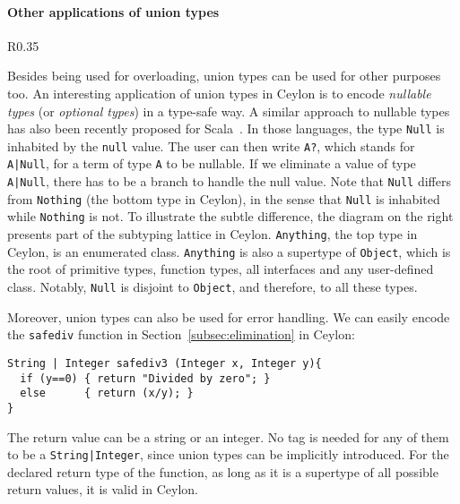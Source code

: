 \paragraph{Other applications of union types}
\begin{wrapfigure}{R}{0.35\textwidth}
\begin{center}
\end{center}
\end{wrapfigure}
Besides being used for overloading, union types can be used for other purposes too.
An interesting application of union types in Ceylon is to
encode \textit{nullable types} (or \textit{optional types}) in a type-safe way.
A similar approach to nullable types has also been recently proposed for
Scala~\citep{nieto20nulls}. In those languages, the type \lstinline{Null} is
inhabited by the \lstinline{null} value. The user can then write \lstinline{A?},
which stands for \lstinline{A|Null}, for a term of type \lstinline{A} to be
nullable. If we eliminate a value of type \lstinline{A|Null}, there has to be a
branch to handle the null value. Note that \lstinline{Null} differs from
\lstinline{Nothing} (the bottom type in Ceylon), in the sense that
\lstinline{Null} is inhabited while \lstinline{Nothing} is not. To illustrate
the subtle difference, the diagram on the right presents part of the subtyping
lattice in Ceylon. \lstinline{Anything}, the top type in Ceylon, is an
enumerated class. \lstinline{Anything} is also a supertype of
\lstinline{Object}, which is the root of primitive types, function types, all
interfaces and any user-defined class. Notably, \lstinline{Null} is disjoint to
\lstinline{Object}, and therefore, to all these types.

Moreover, union types can also be used for error handling.
We can easily encode the \lstinline{safediv} function in Section~\ref{subsec:elimination}
in Ceylon:
%
\begin{lstlisting}
String | Integer safediv3 (Integer x, Integer y){
  if (y==0) { return "Divided by zero"; }
  else      { return (x/y); }
}
\end{lstlisting}
%
The return value can be a string or an integer.
No tag is needed for any of them to be a \lstinline{String|Integer},
since union types can be implicitly introduced.
For the declared return type of the function, as long as it is
a supertype of all possible return values, it is valid
in Ceylon.





